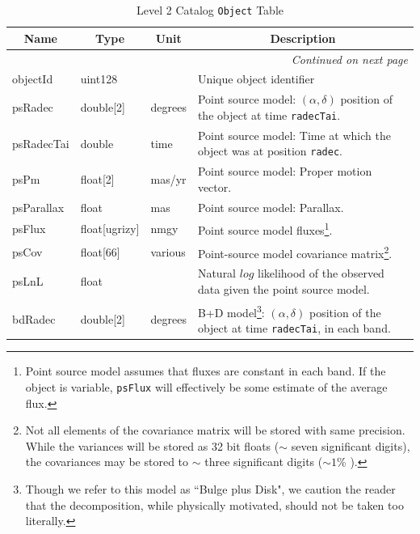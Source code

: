 \documentclass[12pt]{article}
\newcommand{\code}[1]{\texttt{#1}}
\newcommand{\DIASource}{\code{DIASource}\xspace}
\newcommand{\Object}{\code{Object}\xspace}
\begin{document}
\begin{center}
\begin{longtable}{p{3cm}p{2cm}p{2cm}p{5cm}}
\caption[\DIASource Table]{Level 2 Catalog \Object Table
} \\

\hline \multicolumn{1}{c}{\bf Name} & \multicolumn{1}{c}{\bf Type} & \multicolumn{1}{c}{\bf Unit} & \multicolumn{1}{c}{\bf Description} \\ \hline
\endhead

\hline \multicolumn{4}{r}{{\em Continued on next page}} \\
\endfoot

\hline\hline
\endlastfoot

objectId & uint128 & ~ & Unique object identifier \\ 

psRadec & double[2] & degrees & Point source model: $(\alpha, \delta)$ position of the object at time {\tt radecTai}. \\

psRadecTai & double & time & Point source model: Time at which the object was at position {\tt radec}. \\

psPm & float[2] & mas/yr & Point source model: Proper motion vector.\\ 

psParallax & float & mas & Point source model: Parallax. \\ 

psFlux & float[ugrizy] & nmgy & Point source model fluxes\footnote{Point source model assumes that fluxes are constant in each band. If the object is variable, {\tt psFlux} will effectively be some estimate of the average flux.}.\\ 

psCov & float[66] & various & Point-source model covariance matrix\footnote{Not all elements of the covariance matrix will be stored with same precision. While the variances will be stored as 32 bit floats ($\sim$ seven significant digits), the covariances may be stored to $\sim$ three significant digits ($\sim 1$\% ).}. \\ 

psLnL & float & ~ & Natural $log$ likelihood of the observed data given the point source model. \\ 


bdRadec & double[2] & degrees & B+D model\footnote{Though we refer to this model as ``Bulge plus Disk", we caution the reader that the decomposition, while physically motivated, should not be taken too literally.}: $(\alpha, \delta)$ position of the object at time {\tt radecTai}, in each band. \\


\end{longtable}
\end{center}
\end{document}
